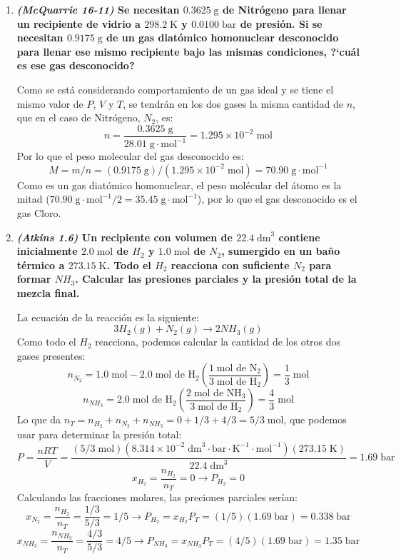 \documentclass[a4paper,12pt]{article}
\begin{document}
\begin{enumerate}
 \item \textbf{\textit{(McQuarrie 16-11)} Se necesitan $0.3625\;\mbox{g}$ de Nitr\'ogeno para llenar un recipiente de vidrio a $298.2\;\mbox{K}$ y $0.0100\;\mbox{bar}$ de presi\'on. Si se necesitan $0.9175\;\mbox{g}$ de un gas diat\'omico homonuclear desconocido para llenar ese mismo recipiente bajo las mismas condiciones, ?`cu\'al es ese gas desconocido?} %

Como se est\'a considerando comportamiento de un gas ideal y se tiene el mismo valor de $P$, $V$ y $T$, se tendr\'an en los dos gases la misma cantidad de $n$, que en el caso de Nitr\'ogeno, $N_2$, es:
$$n=\frac{0.3625\;\mbox{g}}{28.01\;\mbox{g}\cdot\mbox{mol}^{-1}}=1.295\times 10^{-2}\;\mbox{mol}$$
Por lo que el peso molecular del gas desconocido es:
$$M=m/n=(0.9175\;\mbox{g})/(1.295\times 10^{-2}\;\mbox{mol})=70.90\;\mbox{g}\cdot\mbox{mol}^{-1}$$
Como es un gas diat\'omico homonuclear, el peso mol\'ecular del \'atomo es la mitad ($70.90\;\mbox{g}\cdot\mbox{mol}^{-1}/2=35.45\;\mbox{g}\cdot\mbox{mol}^{-1}$), por lo que el gas desconocido es el gas Cloro.

 \item \textbf{\textit{(Atkins 1.6)} Un recipiente con volumen de $22.4\;\mbox{dm}^3$ contiene inicialmente $2.0\;\mbox{mol}$ de $H_2$ y $1.0\;\mbox{mol}$ de $N_2$, sumergido en un ba\~no t\'ermico a $273.15\;\mbox{K}$. Todo el $H_2$ reacciona con suficiente $N_2$ para formar $NH_3$. Calcular las presiones parciales y la presi\'on total de la mezcla final.} %

La ecuaci\'on de la reacci\'on es la siguiente:
$$3H_2(g)+N_2(g)\rightarrow 2NH_3(g)$$
Como todo el $H_2$ reacciona, podemos calcular la cantidad de los otros dos gases presentes:
$$n_{N_2}=1.0\;\mbox{mol}-2.0\;\mbox{mol de H}_2\left(\frac{1\;\mbox{mol de N}_2}{3\;\mbox{mol de H}_2}\right)=\frac{1}{3}\;\mbox{mol}$$
$$n_{NH_3}=2.0\;\mbox{mol de H}_2\left(\frac{2\;\mbox{mol de NH}_3}{3\;\mbox{mol de H}_2}\right)=\frac{4}{3}\;\mbox{mol}$$
Lo que da $n_T=n_{H_2}+n_{N_2}+n_{NH_3}=0+1/3+4/3=5/3\;\mbox{mol}$, que podemos usar para determinar la presi\'on total:
$$P=\frac{nRT}{V}=\frac{(5/3\;\mbox{mol})(8.314\times 10^{-2}\;\mbox{dm}^3\cdot\mbox{bar}\cdot\mbox{K}^{-1}\cdot\mbox{mol}^{-1})(273.15\;\mbox{K})}{22.4\;\mbox{dm}^3}=1.69\;\mbox{bar}$$
$$x_{H_2}=\frac{n_{H_2}}{n_T}=0\rightarrow P_{H_2}=0$$
Calculando las fracciones molares, las preciones parciales ser\'ian:
$$x_{N_2}=\frac{n_{H_2}}{n_T}=\frac{1/3}{5/3}=1/5\rightarrow P_{H_2}=x_{H_2}P_T=(1/5)(1.69\;\mbox{bar})=0.338\;\mbox{bar}$$
$$x_{NH_3}=\frac{n_{NH_3}}{n_T}=\frac{4/3}{5/3}=4/5\rightarrow P_{NH_3}=x_{NH_3}P_T=(4/5)(1.69\;\mbox{bar})=1.35\;\mbox{bar}$$


\end{enumerate}
\end{document}
